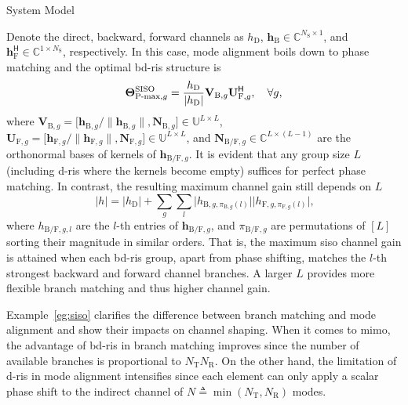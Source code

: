 \documentclass[journal]{IEEEtran}
\begin{document}
\begin{section}{System Model}
		\begin{example}
			\label{eg:siso}
			Denote the direct, backward, forward channels as $h_\mathrm{D}$, $\mathbf{h}_\mathrm{B} \in \mathbb{C}^{N_\mathrm{S} \times 1}$, and $\mathbf{h}_\mathrm{F}^\mathsf{H} \in \mathbb{C}^{1 \times N_\mathrm{S}}$, respectively.
			In this case, mode alignment boils down to phase matching and the optimal \gls{bd}-\gls{ris} structure is
			\begin{equation}
				\mathbf{\Theta}_{\textnormal{P-max},g}^\textnormal{SISO} = \frac{h_\mathrm{D}}{\lvert h_\mathrm{D} \rvert} \mathbf{V}_{\mathrm{B},g} \mathbf{U}_{\mathrm{F},g}^\mathsf{H}, \quad \forall g,
			\end{equation}
			where $\mathbf{V}_{\mathrm{B},g} = \bigl[\mathbf{h}_{\mathrm{B},g}/\lVert \mathbf{h}_{\mathrm{B},g} \rVert, \mathbf{N}_{\mathrm{B},g}\bigr] \in \mathbb{U}^{L \times L}$, $\mathbf{U}_{\mathrm{F},g} = \bigl[\mathbf{h}_{\mathrm{F},g}/\lVert \mathbf{h}_{\mathrm{F},g} \rVert, \mathbf{N}_{\mathrm{F},g}\bigr] \in \mathbb{U}^{L \times L}$, and $\mathbf{N}_{\mathrm{B/F},g} \in \mathbb{C}^{L \times (L-1)}$ are the orthonormal bases of kernels of $\mathbf{h}_{\mathrm{B/F},g}$.
			It is evident that any group size $L$ (including \gls{d}-\gls{ris} where the kernels become empty) suffices for perfect phase matching.
			In contrast, the resulting maximum channel gain still depends on $L$
			\begin{equation}
				\ \lvert h \rvert = \lvert h_\mathrm{D} \rvert + \sum_g \sum_l \lvert h_{\mathrm{B},g,\pi_{\mathrm{B},g}(l)} \rvert \lvert h_{\mathrm{F},g,\pi_{\mathrm{F},g}(l)} \rvert,
			\end{equation}
			where $h_{\mathrm{B/F},g,l}$ are the $l$-th entries of $\mathbf{h}_{\mathrm{B/F},g}$, and $\pi_{\mathrm{B/F},g}$ are permutations of $[L]$ sorting their magnitude in similar orders.
			That is, the maximum \gls{siso} channel gain is attained when each \gls{bd}-\gls{ris} group, apart from phase shifting, matches the $l$-th strongest backward and forward channel branches.
			A larger $L$ provides more flexible branch matching and thus higher channel gain.
		\end{example}

		Example~\ref{eg:siso} clarifies the difference between branch matching and mode alignment and show their impacts on channel shaping.
		When it comes to \gls{mimo}, the advantage of \gls{bd}-\gls{ris} in branch matching improves since the number of available branches is proportional to $N_\mathrm{T} N_\mathrm{R}$. On the other hand, the limitation of \gls{d}-\gls{ris} in mode alignment intensifies since each element can only apply a scalar phase shift to the indirect channel of $N \triangleq \min(N_\mathrm{T}, N_\mathrm{R})$ modes.


\end{section}
\end{document}
